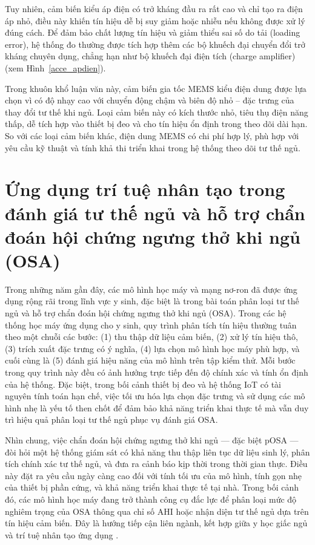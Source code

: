 Tuy nhiên, cảm biến kiểu áp điện có trở kháng đầu ra rất cao và chỉ tạo ra điện áp nhỏ, điều này khiến tín hiệu dễ bị suy giảm hoặc nhiễu nếu không được xử lý đúng cách. Để đảm bảo chất lượng tín hiệu và giảm thiểu sai số do tải (loading error), hệ thống đo thường được tích hợp thêm các bộ khuếch đại chuyển đổi trở kháng chuyên dụng, chẳng hạn như bộ khuếch đại điện tích (charge amplifier) (xem Hình~\ref{acce_apdien}).



Trong khuôn khổ luận văn này, cảm biến gia tốc MEMS kiểu điện dung được lựa chọn vì có độ nhạy cao với chuyển động chậm và biên độ nhỏ – đặc trưng của thay đổi tư thế khi ngủ. Loại cảm biến này có kích thước nhỏ, tiêu thụ điện năng thấp, dễ tích hợp vào thiết bị đeo và cho tín hiệu ổn định trong theo dõi dài hạn. So với các loại cảm biến khác, điện dung MEMS có chi phí hợp lý, phù hợp với yêu cầu kỹ thuật và tính khả thi triển khai trong hệ thống theo dõi tư thế ngủ.

\section{Ứng dụng trí tuệ nhân tạo trong đánh giá tư thế ngủ và hỗ trợ chẩn đoán hội chứng ngưng thở khi ngủ (OSA)}
Trong những năm gần đây, các mô hình học máy và mạng nơ-ron đã được 
ứng dụng rộng rãi trong lĩnh vực y sinh, đặc biệt là trong bài toán 
phân loại tư thế ngủ và hỗ trợ chẩn đoán hội chứng ngưng thở khi ngủ 
(OSA). Trong các hệ thống học máy ứng dụng cho y sinh, quy trình 
phân tích tín hiệu thường tuân theo một chuỗi các bước: (1) thu thập 
dữ liệu cảm biến, (2) xử lý tín hiệu thô, (3) trích xuất đặc trưng 
có ý nghĩa, (4) lựa chọn mô hình học máy phù hợp, và cuối cùng là 
(5) đánh giá hiệu năng của mô hình trên tập kiểm thử.
Mỗi bước trong quy trình này đều có ảnh hưởng trực tiếp đến độ chính xác 
và tính ổn định của hệ thống. Đặc biệt, trong bối cảnh thiết bị đeo và 
hệ thống IoT có tài nguyên tính toán hạn chế, việc tối ưu hóa lựa chọn 
đặc trưng và sử dụng các mô hình nhẹ là yếu tố then chốt để đảm bảo 
khả năng triển khai thực tế mà vẫn duy trì hiệu quả phân loại tư thế 
ngủ phục vụ đánh giá OSA.



Nhìn chung, việc chẩn đoán hội chứng ngưng thở khi ngủ — đặc biệt pOSA — đòi hỏi 
một hệ thống giám sát có khả năng thu thập liên tục dữ liệu sinh lý, 
phân tích chính xác tư thế ngủ, và đưa ra cảnh báo kịp thời trong 
thời gian thực. Điều này đặt ra yêu cầu ngày càng cao đối với tính tối 
ưu của mô hình, tính gọn nhẹ của thiết bị phần cứng, và khả năng triển 
khai thực tế tại nhà. Trong bối cảnh đó, các mô hình học máy đang trở thành 
công cụ đắc lực để phân loại mức độ nghiêm trọng của OSA 
thông qua chỉ số AHI hoặc nhận diện tư thế ngủ dựa trên tín hiệu cảm biến. 
Đây là hướng tiếp cận liên ngành, kết hợp giữa y học giấc ngủ và 
trí tuệ nhân tạo ứng dụng \cite{osa_sanchez2025}. 

